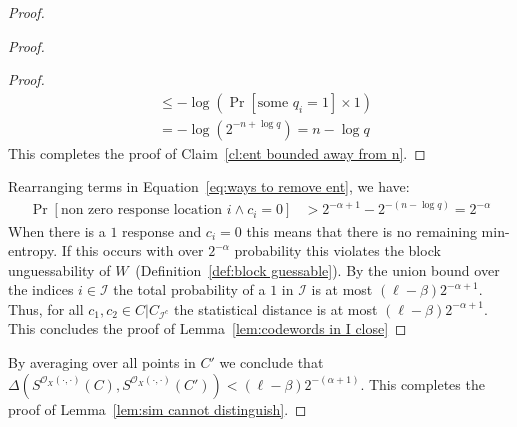 \documentclass[11pt]{article}
\newcommand{\defref}[1]{\mbox{Definition~\ref{#1}}}
\newcommand{\lemref}[1]{\mbox{Lemma~\ref{#1}}}
\newcommand{\clref}[1]{\mbox{Claim~\ref{#1}}}
\begin{document}
\begin{proof}
\begin{proof}
\begin{proof}
\begin{align*}
&\leq  -\log \left(\Pr[\text{some }q_i=1]\times 1\right)\\
&=-\log\left( 2^{-n+\log q} \right) = n-\log q
\end{align*}
This completes the proof of \clref{cl:ent bounded away from n}.
\end{proof}
\noindent
Rearranging terms in Equation~\ref{eq:ways to remove ent}, we have:
\begin{align*}
 \Pr[\text{non zero response location }i \wedge c_i=0] &>2^{-\alpha+1} - 2^{-(n-\log q)}=  2^{-\alpha}
 \end{align*}
 When there is a $1$ response and $c_i=0$ this means that there is no remaining min-entropy.  If this occurs with over $2^{-\alpha}$ probability this violates the block unguessability of $W$~(\defref{def:block guessable}).  By the union bound over the indices $i\in\mathcal{I}$ the total probability of a $1$ in $\mathcal{I}$ is at most $(\ell-\beta)2^{-\alpha+1}$. Thus, for all $c_1, c_2\in C| C_{\mathcal{I}^c}$ the statistical distance is at most $(\ell- \beta)2^{-\alpha+1}$.  This concludes the proof of \lemref{lem:codewords in I close}
\end{proof}
By averaging over all points in $C'$ we conclude that $\Delta(S^{\mathcal{O}_X(\cdot, \cdot)}(C), S^{\mathcal{O}_X(\cdot, \cdot)}(C')) < (\ell -\beta)2^{-(\alpha+1)}$.  This completes the proof of \lemref{lem:sim cannot distinguish}.
\end{proof}
\end{document}
